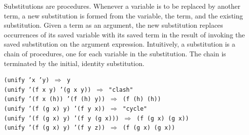 Substitutions are procedures.
Whenever a variable is to be replaced by another term, a new
substitution is formed from the variable, the term, and
the existing substitution.
Given a term as an argument, the new substitution replaces
occurrences of its saved variable with its saved term in the
result of invoking the saved substitution on the argument expression.
Intuitively, a substitution is a chain of procedures, one for each
variable in the substitution.
The chain is terminated by the initial, identity substitution.


\begin{alltt}
(unify 'x 'y) \(\Rightarrow\) y
(unify '(f x y) '(g x y)) \(\Rightarrow\) "clash"
(unify '(f x (h)) '(f (h) y)) \(\Rightarrow\) (f (h) (h))
(unify '(f (g x) y) '(f y x)) \(\Rightarrow\) "cycle"
(unify '(f (g x) y) '(f y (g x))) \(\Rightarrow\) (f (g x) (g x))
(unify '(f (g x) y) '(f y z)) \(\Rightarrow\) (f (g x) (g x))
\end{alltt}


